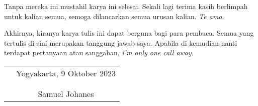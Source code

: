 \documentclass{skripsiactugm}
\begin{document}
Tanpa mereka ini mustahil karya ini selesai. Sekali lagi terima kasih
berlimpah untuk kalian semua, semoga dilancarkan semua urusan kalian. \textit{Te
	amo}.

Akhirnya, kiranya karya tulis ini dapat berguna bagi para pembaca. Semua yang tertulis
di sini merupakan tanggung jawab saya. Apabila di kemudian nanti terdapat
pertanyaan atau sanggahan, \textit{i'm only one call away}.
\vspace{0.8cm}

\begin{tabular}{p{7cm}c}
	 & Yogyakarta, 9 Oktober 2023 \\
	 &                            \\
	 &                            \\
	 & Samuel Johanes
\end{tabular}

\newpage
{}
{}
\makeatletter
\renewcommand{\l@chapter}[2]{\ifnum \c@tocdepth >\z@\addpenalty\@secpenalty\addvspace{0em}
		\setlength{\@tempdima}{1.4em}
		\begingroup\parindent \z@ \rightskip \@pnumwidth\parfillskip -\@pnumwidth\leavevmode
		\bfseries\advance\leftskip\@tempdima\hskip -\leftskip#1\nobreak\ \leaders\hbox{$\m@th\mkern \@dotsep mu\hbox{.}\mkern \@dotsep mu$}\hfil\nobreak\hb@xt@\@pnumwidth{\hss #2}\par\endgroup\fi}
\makeatother
\begin{singlespacing}
	\tableofcontents
\end{singlespacing}

\newpage
{}
{}
\begin{singlespacing}
	\listoftables
\end{singlespacing}
\end{document}
